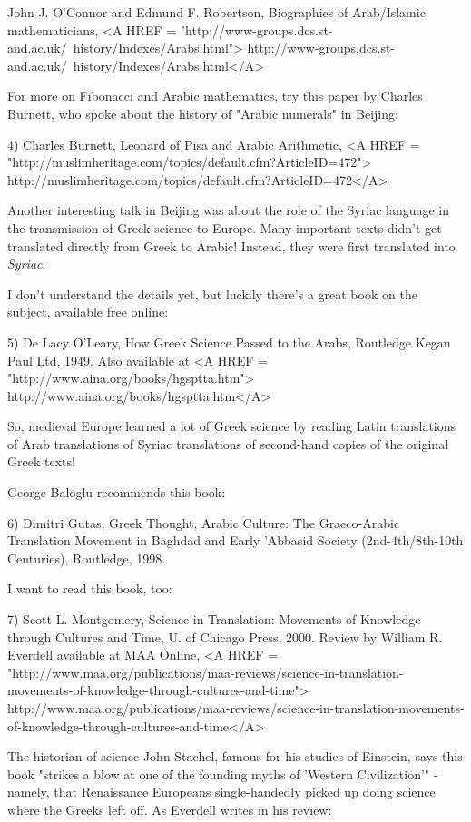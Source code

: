 John J. O'Connor and Edmund F. Robertson, 
Biographies of Arab/Islamic mathematicians,
<A HREF = "http://www-groups.dcs.st-and.ac.uk/~history/Indexes/Arabs.html">
http://www-groups.dcs.st-and.ac.uk/~history/Indexes/Arabs.html</A>

For more on Fibonacci and Arabic mathematics, try this paper by
Charles Burnett, who spoke about the history of
"Arabic numerals" in Beijing:

4) Charles Burnett, Leonard of Pisa and Arabic Arithmetic,
<A HREF = "http://muslimheritage.com/topics/default.cfm?ArticleID=472">
http://muslimheritage.com/topics/default.cfm?ArticleID=472</A>

Another interesting talk in Beijing was about the role of the 
Syriac language in the transmission of Greek science to Europe.
Many important texts didn't get translated directly from Greek to 
Arabic!  Instead, they were first translated into \emph{Syriac}.

I don't understand the details yet, but luckily there's a great
book on the subject, available free online:

5) De Lacy O'Leary, How Greek Science Passed to the Arabs,
Routledge \text{\&}  Kegan Paul Ltd, 1949.  Also available at
<A HREF = "http://www.aina.org/books/hgsptta.htm">
http://www.aina.org/books/hgsptta.htm</A>

So, medieval Europe learned a lot of Greek science by reading Latin 
translations of Arab translations of Syriac translations of 
second-hand copies of the original Greek texts!

George Baloglu recommends this book:

6) Dimitri Gutas, Greek Thought, Arabic Culture: The Graeco-Arabic 
Translation Movement in Baghdad and Early 'Abbasid Society 
(2nd-4th/8th-10th Centuries), Routledge, 1998.

I want to read this book, too:

7) Scott L. Montgomery, Science in Translation: Movements of 
Knowledge through Cultures and Time, U. of Chicago Press, 2000.
Review by William R. Everdell available at MAA Online,
<A HREF = "http://www.maa.org/publications/maa-reviews/science-in-translation-movements-of-knowledge-through-cultures-and-time">
http://www.maa.org/publications/maa-reviews/science-in-translation-movements-of-knowledge-through-cultures-and-time</A>

The historian of science John Stachel, famous for his studies of
Einstein, says this book "strikes a blow at one of the founding
myths of 'Western Civilization'" - namely, that Renaissance Europeans
single-handedly picked up doing science where the Greeks left off.  
As Everdell writes in his review:


